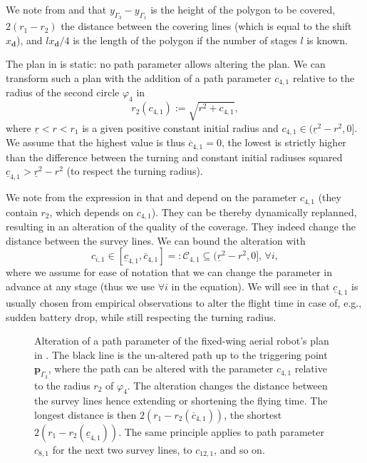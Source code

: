 We note from  and  that $y_{\Gamma_3}-y_{\Gamma_1}$ is the height of the polygon to be covered, $2(r_1-r_2)$ the distance between the covering lines (which is equal to the shift $x_\mathbf{d}$), and $lx_\mathbf{d}/4$ is the length of the polygon if the number of stages $l$ is known.

The plan in  is static: no path parameter allows altering the plan. We can transform such a plan with the addition of a path parameter $c_{4,1}$ relative to the radius of the second circle $\varphi_4$ in 
\begin{equation}\label{eq:radius-dynamic}
  r_2(c_{4,1}):=\sqrt{r^2+c_{4,1}},
\end{equation}
where $\underline{r}<r<r_1$ is a given positive constant initial radius and $c_{4,1}\in(\underline{r}^2-r^2,0]$. We assume that the highest value is thus $\overline{c}_{4,1}=0$, the lowest is strictly higher than the difference between the turning and constant initial radiuses squared $\underline{c}_{4,1}>\underline{r}^2-r^2$ (to respect the turning radius).

We note from the expression in  that  and  depend on the parameter $c_{4,1}$ (they contain $r_2$, which depends on $c_{4,1}$). They can be thereby dynamically replanned, resulting in an alteration of the quality of the coverage. They indeed change the distance between the survey lines.
We can bound the alteration with 
\begin{equation}\label{eq:path-const-c}
  c_{i,1}\in[\underline{c}_{4,1},\overline{c}_{4,1}]=:\mathcal{C}_{4,1}\subseteq(\underline{r}^2-r^2,0],\,\forall i,
\end{equation} 
where we assume for ease of notation that we can change the parameter in advance at any stage (thus we use $\forall i$ in the equation). We will see in  that $\underline{c}_{4,1}$ is usually chosen from empirical observations to alter the flight time in case of, e.g., sudden battery drop, while still respecting the turning radius.

\begin{sidewaysfigure}
  \rotatesidewayslabel
  \centering
  
  \vspace*{30pt}
  \caption[Alteration of a path parameter with the Zamboni-like motion]{Alteration of a path parameter of the fixed-wing aerial robot's plan in . The black line is the un-altered path up to the triggering point $\mathbf{p}_{\Gamma_3}$, where the path can be altered with the parameter $c_{4,1}$ relative to the radius $r_2$ of $\varphi_4$. The alteration changes the distance between the survey lines hence extending or shortening the flying time. The longest distance is then $2(r_1-r_2(\overline{c}_{4,1}))$, the shortest $2(r_1-r_2(\underline{c}_{4,1}))$. The same principle applies to path parameter $c_{8,1}$ for the next two survey lines, to $c_{12,1}$, and so on.}
  \label{fig:zambo-repla_pb}
\end{sidewaysfigure}

